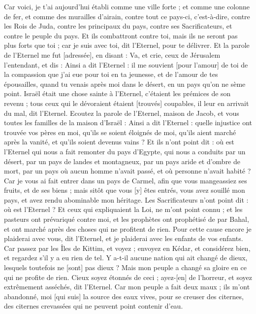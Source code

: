 \begin{multicols}{2}
Car voici, je t'ai aujourd'hui établi comme une ville forte ; et comme une colonne de fer, et comme des murailles d'airain, contre tout ce pays-ci, c'est-à-dire, contre les Rois de Juda, contre les principaux du pays, contre ses Sacrificateurs, et contre le peuple du pays.
Et ils combattront contre toi, mais ils ne seront pas plus forts que toi ; car je suis avec toi, dit l'Eternel, pour te délivrer.
\VerseOne{}Et la parole de l'Eternel me fut [adressée], en disant :
Va, et crie, ceux de Jérusalem l'entendant, et dis : Ainsi a dit l'Eternel : il me souvient [pour l'amour] de toi de la compassion que j'ai eue pour toi en ta jeunesse, et de l'amour de tes épousailles, quand tu venais après moi dans le désert, en un pays qu'on ne sème point.
Israël était une chose sainte à l'Eternel, c'étaient les prémices de son revenu ; tous ceux qui le dévoraient étaient [trouvés] coupables, il leur en arrivait du mal, dit l'Eternel.
Ecoutez la parole de l'Eternel, maison de Jacob, et vous toutes les familles de la maison d'Israël :
Ainsi a dit l'Eternel : quelle injustice ont trouvée vos pères en moi, qu'ils se soient éloignés de moi, qu'ils aient marché après la vanité, et qu'ils soient devenus vains ?
Et ils n'ont point dit : où est l'Eternel qui nous a fait remonter du pays d'Egypte, qui nous a conduits par un désert, par un pays de landes et montagneux, par un pays aride et d'ombre de mort, par un pays où aucun homme n'avait passé, et où personne n'avait habité ?
Car je vous ai fait entrer dans un pays de Carmel, afin que vous mangeassiez ses fruits, et de ses biens ; mais sitôt que vous [y] êtes entrés, vous avez souillé mon pays, et avez rendu abominable mon héritage.
Les Sacrificateurs n'ont point dit : où est l'Eternel ? Et ceux qui expliquaient la Loi, ne m'ont point connu ; et les pasteurs ont prévariqué contre moi, et les prophètes ont prophétisé de par Bahal, et ont marché après des choses qui ne profitent de rien.
Pour cette cause encore je plaiderai avec vous, dit l'Eternel, et je plaiderai avec les enfants de vos enfants.
Car passez par les Îles de Kittim, et voyez ; envoyez en Kédar, et considérez bien, et regardez s'il y a eu rien de tel.
Y a-t-il aucune nation qui ait changé de dieux, lesquels toutefois ne [sont] pas dieux ? Mais mon peuple a changé sa gloire en ce qui ne profite de rien.
Cieux soyez étonnés de ceci ; ayez-[en] de l'horreur, et soyez extrêmement asséchés, dit l'Eternel.
Car mon peuple a fait deux maux ; ils m'ont abandonné, moi [qui suis] la source des eaux vives, pour se creuser des citernes, des citernes crevassées qui ne peuvent point contenir d'eau.

\end{multicols}
